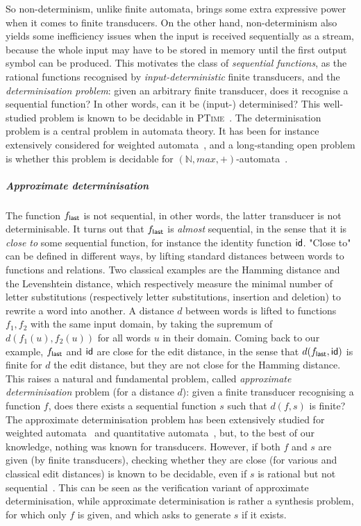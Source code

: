 \documentclass[a4paper,UKenglish,cleveref, autoref, thm-restate,authorcolumns, colorlinks]{lipics-v2021}
\begin{document}
So non-determinism, unlike finite automata, brings some extra expressive power when it comes to finite transducers. On the other hand, non-determinism also yields some inefficiency issues when the input is received sequentially as a stream, because the whole input may have to be stored in memory until the first output symbol can be produced. This motivates the class of \emph{sequential functions}, as the rational functions recognised by \emph{input-deterministic} finite transducers, and the \emph{determinisation problem}: given an arbitrary finite transducer, does it recognise a sequential function? In other words, can it be (input-) determinised? This well-studied problem is known to be decidable in \textsc{PTime}~\cite{twinningproperty}. The determinisation problem is a central problem in automata theory. It has been for instance extensively considered for weighted automata~\cite{DBLP:journals/coling/Mohri97}, and a long-standing open problem is whether this problem is decidable for $(\mathbb{N},max,+)$-automata~\cite{DBLP:conf/stacs/KirstenL09}. 


\subparagraph*{Approximate determinisation} The function $f_{\sf last}$ is not sequential, in other words, the latter transducer is not determinisable. It turns out that $f_{\sf last}$ is \emph{almost} sequential, in the sense that it is \emph{close to} some sequential function, for instance the identity function ${\sf id}$. "Close to" can be defined in different ways, by lifting standard distances between words to functions and relations. Two classical examples are
the Hamming distance and the Levenshtein distance, which respectively measure the minimal number of letter substitutions (respectively letter substitutions, insertion and deletion) to rewrite a word into another. A distance $d$ between words is lifted to functions $f_1,f_2$ with the same input domain, by taking the supremum of $d(f_1(u),f_2(u))$ for all words $u$ in their domain. Coming back to our example, $f_{\sf last}$ and ${\sf id}$ are close for the edit distance, in the sense that $d(f_{\sf last},{\sf id})$ is finite for $d$ the edit distance, but they are not close for the Hamming distance. This raises a natural and fundamental problem, called \emph{approximate determinisation} problem (for a distance $d$): given a finite transducer recognising a function $f$, does there exists a sequential function $s$ such that $d(f,s)$ is finite? The approximate determinisation problem has been extensively studied for weighted automata~\cite{DBLP:conf/lics/AminofKL11,DBLP:journals/algorithmica/BuchsbaumGW01,DBLP:journals/tcs/AminofKL13} and quantitative automata~\cite{DBLP:conf/fsttcs/BokerH12,DBLP:journals/corr/BokerH14}, but, to the best of our knowledge, nothing was known for transducers. However, if both $f$ and $s$ are given (by finite transducers), checking whether they are close (for various and classical edit distances) is known to be decidable, even if $s$ is rational but not sequential~\cite{editdistance}. This can be seen as the verification variant of approximate determinisation, while approximate determinisation is rather a synthesis problem, for which only $f$ is given, and which asks to generate $s$ if it exists.  
\end{document}
